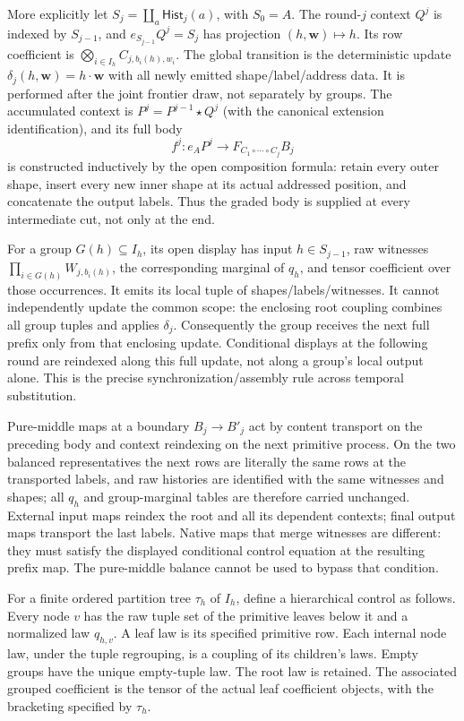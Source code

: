 \documentclass[11pt]{article}
\begin{document}
More explicitly let $S_j=\coprod_a\mathsf{Hist}_j(a)$, with $S_0=A$. The round-$j$ context $Q^j$ is indexed by $S_{j-1}$, and $e_{S_{j-1}}Q^j=S_j$ has projection $(h,\mathbf w)\mapsto h$. Its row coefficient is $\bigotimes_{i\in I_h}C_{j,b_i(h),w_i}$. The global transition is the deterministic update $\delta_j(h,\mathbf w)=h\cdot\mathbf w$ with all newly emitted shape/label/address data. It is performed after the joint frontier draw, not separately by groups. The accumulated context is $P^j=P^{j-1}\star Q^j$ (with the canonical extension identification), and its full body
\[
 f^j:e_AP^j\longrightarrow F_{C_1\circ\cdots\circ C_j}B_j
\]
is constructed inductively by the open composition formula: retain every outer shape, insert every new inner shape at its actual addressed position, and concatenate the output labels. Thus the graded body is supplied at every intermediate cut, not only at the end.

For a group $G(h)\subseteq I_h$, its open display has input $h\in S_{j-1}$, raw witnesses $\prod_{i\in G(h)}W_{j,b_i(h)}$, the corresponding marginal of $q_h$, and tensor coefficient over those occurrences. It emits its local tuple of shapes/labels/witnesses. It cannot independently update the common scope: the enclosing root coupling combines all group tuples and applies $\delta_j$. Consequently the group receives the next full prefix only from that enclosing update. Conditional displays at the following round are reindexed along this full update, not along a group's local output alone. This is the precise synchronization/assembly rule across temporal substitution.

Pure-middle maps at a boundary $B_j\to B'_j$ act by content transport on the preceding body and context reindexing on the next primitive process. On the two balanced representatives the next rows are literally the same rows at the transported labels, and raw histories are identified with the same witnesses and shapes; all $q_h$ and group-marginal tables are therefore carried unchanged. External input maps reindex the root and all its dependent contexts; final output maps transport the last labels. Native maps that merge witnesses are different: they must satisfy the displayed conditional control equation at the resulting prefix map. The pure-middle balance cannot be used to bypass that condition.

For a finite ordered partition tree $\tau_h$ of $I_h$, define a hierarchical control as follows. Every node $v$ has the raw tuple set of the primitive leaves below it and a normalized law $q_{h,v}$. A leaf law is its specified primitive row. Each internal node law, under the tuple regrouping, is a coupling of its children's laws. Empty groups have the unique empty-tuple law. The root law is retained. The associated grouped coefficient is the tensor of the actual leaf coefficient objects, with the bracketing specified by $\tau_h$.
\end{document}
